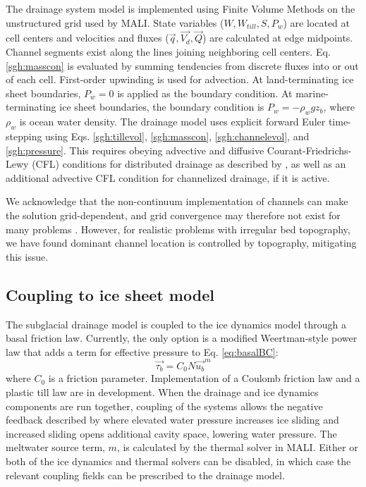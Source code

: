 The drainage system model is implemented using Finite Volume Methods on the unstructured grid used by MALI.  
State variables ($W, W_{till}, S, P_w$) are located at cell centers and 
velocities and fluxes ($\vec{q}, \vec{V_d}, \vec{Q}$) are calculated at edge midpoints.
Channel segments exist along the lines joining neighboring cell centers.
Eq. \ref{sgh:masscon} is evaluated by summing tendencies from discrete fluxes into or out of each cell.
First-order upwinding is used for advection.
At land-terminating ice sheet boundaries, $P_w=0$ is applied as the boundary condition.
At marine-terminating ice sheet boundaries, the boundary condition is $P_w=-\rho_w g z_b$, where $\rho_w$ is ocean water density.
The drainage model uses explicit forward Euler time-stepping using 
Eqs. \ref{sgh:tillevol}, \ref{sgh:masscon}, \ref{sgh:channelevol}, and \ref{sgh:pressure}.
This requires obeying advective and diffusive Courant-Friedrichs-Lewy (CFL) conditions for distributed drainage as described by \cite{Bueler2015}, 
as well as an additional advective CFL condition for channelized drainage, if it is active.

We acknowledge that the non-continuum implementation of channels can make the solution
grid-dependent, and grid convergence may therefore not exist for many problems \citep{Bueler2015}.
However, for realistic problems with irregular bed topography, we have found dominant
channel location is controlled by topography, mitigating this issue.

\subsection{Coupling to ice sheet model}
\label{sec:sgh-coupling}

The subglacial drainage model is coupled to the ice dynamics model through a basal friction law.
Currently, the only option is a modified Weertman-style power law \citep{Bindschadler1983,Hewitt2013} that adds a term for effective pressure to Eq. \ref{eq:basalBC}:
\begin{equation}
 \vec{\tau_b} = C_0 N \vec{u_b}^m
\label{sgh:frictionlaw}
\end{equation}
where $C_0$ is a friction parameter.
Implementation of a Coulomb friction law \citep{Schoof2005, Gagliardini2007}
and a plastic till law \citep{Tulaczyk2000a,Bueler2015} are in development.
When the drainage and ice dynamics components are run together,
coupling of the systems allows the negative feedback described by \citep{Hoffman2014}
where elevated water pressure increases ice sliding and increased sliding opens additional cavity space, lowering water pressure.
The meltwater source term, $m$, is calculated by the thermal solver in MALI.
Either or both of the ice dynamics and thermal solvers can be disabled, 
in which case the relevant coupling fields can be prescribed to the drainage model.

